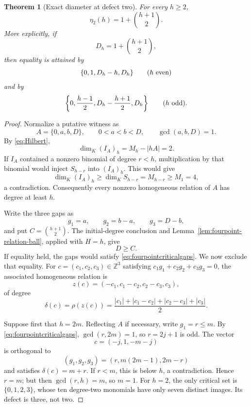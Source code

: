 \documentclass[11pt,reqno]{amsart}
\newtheorem{theorem}{Theorem}[section]
\theoremstyle{definition}
\theoremstyle{remark}
\newcommand{\Z}{\mathbb Z}
\begin{document}
\begin{theorem}[Exact diameter at defect two]
\label{thm:defecttwodiameter}
For every $h\geq2$,
\begin{equation}\label{eq:defecttwodiameter}
 \boxed{\qquad \eta_2(h)=1+\binom{h+1}{2}.\qquad}
\end{equation}
More explicitly, if
\[
 D_h=1+\binom{h+1}{2},
\]
then equality is attained by
\[
 \{0,1,D_h-h,D_h\}\qquad(h\ \textup{even})
\]
and by
\[
 \left\{0,\frac{h-1}{2},D_h-\frac{h+1}{2},D_h\right\}
 \qquad(h\ \textup{odd}).
\]
\end{theorem}

\begin{proof}
Normalize a putative witness as
\[
 A=\{0,a,b,D\},\qquad 0<a<b<D,\qquad \gcd(a,b,D)=1.
\]
By \eqref{eq:Hilbert},
\[
 \dim_K(I_A)_h=M_h-|hA|=2.
\]
If $I_A$ contained a nonzero binomial of degree $r<h$, multiplication by
that binomial would inject $S_{h-r}$ into $(I_A)_h$.  This would give
\[
 \dim_K(I_A)_h\geq \dim_K S_{h-r}=M_{h-r}\geq M_1=4,
\]
a contradiction.  Consequently every nonzero homogeneous relation of $A$
has degree at least $h$.

Write the three gaps as
\[
 g_1=a,\qquad g_2=b-a,\qquad g_3=D-b,
\]
and put $C=\binom{h+1}{2}$.  The initial-degree conclusion and
Lemma~\ref{lem:fourpoint-relation-ball}, applied with $H=h$, give
\[
 D\geq C.
\]
If equality held, the gaps would satisfy
\eqref{eq:fourpointcriticalgaps}.  We now exclude that equality.
For $c=(c_1,c_2,c_3)\in\Z^3$ satisfying
$c_1g_1+c_2g_2+c_3g_3=0$, the associated homogeneous relation is
\[
 z(c)=(-c_1,c_1-c_2,c_2-c_3,c_3),
\]
of degree
\begin{equation}\label{eq:defecttwotaildegree}
 \delta(c)=\rho(z(c))=
 \frac{|c_1|+|c_1-c_2|+|c_2-c_3|+|c_3|}{2}.
\end{equation}

Suppose first that $h=2m$.  Reflecting $A$ if necessary, write
$g_1=r\leq m$.  By \eqref{eq:fourpointcriticalgaps},
$\gcd(r,2m)=1$, so $r=2j+1$ is odd.  The vector
\[
 c=(-j,1,-m-j)
\]
is orthogonal to
\[
 (g_1,g_2,g_3)=(r,m(2m-1),2m-r)
\]
and satisfies $\delta(c)=m+r$.  If $r<m$, this is below $h$, a
contradiction.  Hence $r=m$; but then $\gcd(r,h)=m$, so $m=1$.
For $h=2$, the only critical set is $\{0,1,2,3\}$, whose ten degree-two
monomials have only seven distinct images.  Its defect is three, not two.


\end{proof}
\end{document}
